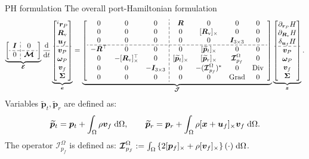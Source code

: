 \documentclass[aspectratio=169]{ISAE-Beamer}
\DeclareMathOperator*{\Grad}{Grad}
\DeclareMathOperator*{\Div}{Div}
\newcommand{\crmat}[1]{\ensuremath{[#1]_{\times}}}
\begin{document}
\begin{frame}{PH formulation}
The overall port-Hamiltonian formulation
\begin{equation*}
\setlength{\dashlinegap}{2pt}
\underbrace{
	{\left[ \begin{array}{c:c}
		\bm{I} & 0 \\
		\hdashline
		0 & \bm{\mathcal{M}} \\
		\end{array} \right]}
}_{\bm{\mathcal{E}}}
\diff{}{t}
\underbrace{\begin{bmatrix}
	^i \bm{r}_P \\ \bm{R}_{\text{v}} \\ \bm{u}_f \\\hdashline  \bm{v}_P \\ \bm\omega_P  \\ \bm{v}_f  \\ \bm\Sigma \\
	\end{bmatrix}}_{\bm{e}} = 
\underbrace{
	{\left[ \begin{array}{ccc:cccc}
		0 & 0 & 0 &  \bm{R} & 0 & 0 & 0 \\
		0 & 0 & 0 & 0 & \crmat{\bm{R}_{\text{v}}} & 0 & 0 \\
		0 & 0 & 0 & 0 & 0 & \bm{I}_{3\times 3} & 0  \\ 
		\hdashline
		-\bm{R}^\top & 0 & 0 & 0 & \crmat{\widetilde{\bm{p}}_t} & 0 & 0 \\
		0 & -\crmat{\bm{R}_{\text{v}}}^\top & 0 & \crmat{\widetilde{\bm{p}}_t} & \crmat{\widetilde{\bm{p}}_r} & \bm{\mathcal{I}}_{p_f}^\Omega & 0 \\
		0 & 0 & -\bm{I}_{3\times 3} & 0 & -(\bm{\mathcal{I}}_{p_f}^\Omega)^* & 0 & \Div \\
		0 & 0 & 0 & 0 & 0 & \Grad & 0 \\
		\end{array} \right]}
}_{\bm{\mathcal{J}}}
\underbrace{\begin{bmatrix}
	\partial_{\bm{r}_P}H \\ \partial_{\bm{R}_\text{v}}H \\ \delta_{\bm{u}_f} H \\\hdashline  \bm{v}_P \\ \bm\omega_P  \\ \bm{v}_f  \\ \bm\Sigma \\
	\end{bmatrix}}_{\bm{z}}.
\end{equation*} 
Variables $\widetilde{\bm{p}}_t, \widetilde{\bm{p}}_r$ are defined as: 
\[\widetilde{\bm{p}}_t = \bm{p}_t + \int_{\Omega} \rho \bm{v}_f \d{\Omega}, \qquad \widetilde{\bm{p}}_r = \bm{p}_r + \int_{\Omega} \rho \crmat{\bm{x} + \bm{u}_f}\bm{v}_f \d{\Omega}.\]
The operator $\bm{\mathcal{I}}_{p_f}^\Omega$ is defined as: $\bm{\mathcal{I}}_{p_f}^\Omega := \int_\Omega \left\{2 \crmat{\bm{p}_f} + \rho \crmat{\bm{v}_f} \right\}(\cdot) \d{\Omega}$.

\end{frame}
\end{document}
